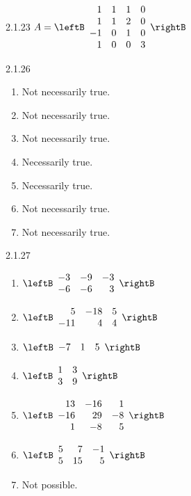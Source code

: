 \begin{Answer}{2.1.23}
$A=\leftB
\begin{array}{rrrr}
1 & 1 & 1 & 0 \\
1 & 1 & 2 & 0 \\
-1 & 0 & 1 & 0 \\
1 & 0 & 0 & 3
\end{array}
\rightB$
\end{Answer}
\begin{Answer}{2.1.26}
\begin{enumerate}
\item Not necessarily true.
\item Not necessarily true.
\item Not necessarily true.
\item Necessarily true.
\item Necessarily true.
\item Not necessarily true.
\item Not necessarily true.
\end{enumerate}
\end{Answer}
\begin{Answer}{2.1.27}
\begin{enumerate}
\item $\leftB
\begin{array}{rrr}
-3 & -9 & -3 \\
-6 & -6 & 3
\end{array}
\rightB$
\item $\leftB
\begin{array}{rrr}
5 & -18 & 5 \\
-11 & 4 & 4
\end{array}
\rightB$
\item $\leftB
\begin{array}{rrr}
-7 & 1 & 5
\end{array}
\rightB$
\item $\leftB
\begin{array}{rr}
1 & 3 \\
3 & 9
\end{array}
\rightB$
\item $\leftB \begin{array}{rrr}
13 & -16 & 1\\
-16 & 29 & -8 \\
1 & -8 & 5
\end{array}
\rightB$
\item $\leftB \begin{array}{rrr}
5 & 7 & -1 \\
5 & 15 & 5
\end{array}
\rightB$
\item Not possible.
\end{enumerate}
\end{Answer}
